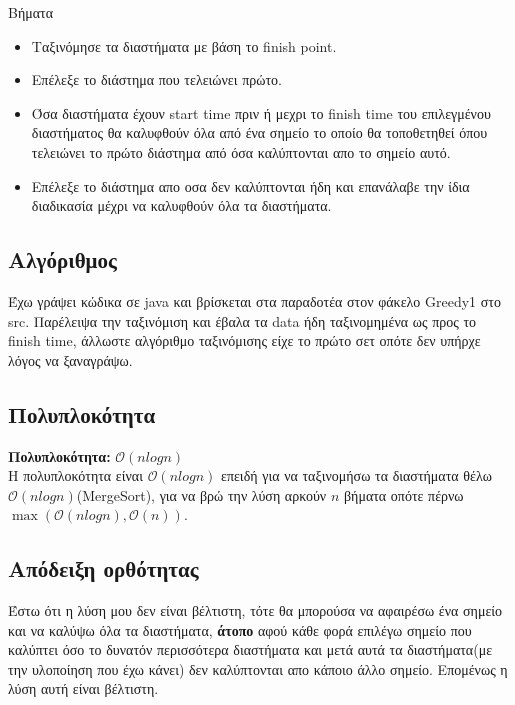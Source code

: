 \documentclass[12pt]{article}
\begin{document}
\begin{algorithm}
	\caption{Βήματα}
	\begin{itemize}
		\item Ταξινόμησε τα διαστήματα με βάση το finish point.\\
		\item Επέλεξε το διάστημα που τελειώνει πρώτο.\\
		\item Όσα διαστήματα έχουν start time πριν ή μεχρι το finish time του επιλεγμένου διαστήματος θα καλυφθούν όλα από ένα σημείο το οποίο θα τοποθετηθεί όπου τελειώνει το πρώτο διάστημα από όσα καλύπτονται απο το σημείο αυτό.\\
		\item Επέλεξε το διάστημα απο οσα δεν καλύπτονται ήδη και επανάλαβε την ίδια διαδικασία μέχρι να καλυφθούν όλα τα διαστήματα.\\
	\end{itemize}
\end{algorithm}

\subsection{Αλγόριθμος}
Έχω γράψει κώδικα σε java και βρίσκεται στα παραδοτέα στον φάκελο Greedy1 στο src.
Παρέλειψα την ταξινόμιση και έβαλα τα data ήδη ταξινομημένα ως προς το finish time, άλλωστε αλγόριθμο ταξινόμισης είχε το πρώτο σετ οπότε δεν υπήρχε λόγος να ξαναγράψω.


\subsection{Πολυπλοκότητα}
\textbf{Πολυπλοκότητα:} $\mathcal{O}(nlogn)$\\
Η πολυπλοκότητα είναι $\mathcal{O}(nlogn)$ επειδή για να ταξινομήσω τα διαστήματα θέλω $\mathcal{O}(nlogn)$(MergeSort), για να βρώ την λύση αρκούν $n$ βήματα οπότε πέρνω $\max{(\mathcal{O}(nlogn),\mathcal{O}(n)) }$.\\

\subsection{Απόδειξη ορθότητας}
Έστω ότι η λύση μου δεν είναι βέλτιστη, τότε θα μπορούσα να αφαιρέσω ένα σημείο και να καλύψω όλα τα διαστήματα, \textbf{άτοπο} αφού κάθε φορά επιλέγω σημείο που καλύπτει όσο το δυνατόν περισσότερα διαστήματα και μετά αυτά τα διαστήματα(με την υλοποίηση που έχω κάνει)  δεν καλύπτονται απο κάποιο άλλο σημείο. Επομένως η λύση αυτή είναι βέλτιστη.\\\\
\end{document}
